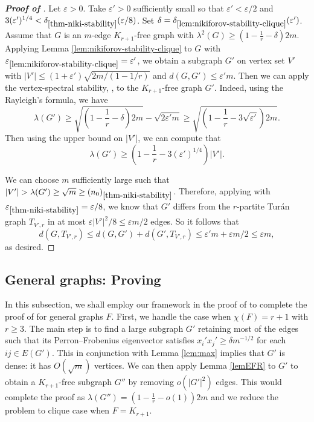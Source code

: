 \documentclass[11pt,a4paper]{article}
\theoremstyle{definition}
\theoremstyle{remark}
\begin{document}
\begin{proof}[{\bf Proof of }] 
Let $\varepsilon>0$. Take $\varepsilon'>0$ sufficiently small so that $\varepsilon'<\varepsilon/2$ and $3(\varepsilon')^{1/4}<\delta_{\ref{thm-niki-stability}}(\varepsilon/8)$. Set $\delta=\delta_{\ref{lem:nikiforov-stability-clique}}(\varepsilon')$. Assume that $G$ is an $m$-edge $K_{r+1}$-free graph with $\lambda^2 (G)\ge {(1- \frac{1}{r} - \delta)2m}$. 
Applying Lemma \ref{lem:nikiforov-stability-clique} to $G$ with $\varepsilon_{\ref{lem:nikiforov-stability-clique}}=\varepsilon'$, we obtain a subgraph $G'$ on vertex set $V'$ with $|V'|\le (1+\varepsilon')\sqrt{2m/(1-1/r)}$ and $d(G,G')\le \varepsilon' m$.
Then we can apply the vertex-spectral stability, , to the $K_{r+1}$-free graph $G'$. 
Indeed, using the Rayleigh's formula, we have 
\[ \lambda (G')\ge \sqrt{\left(1- \frac{1}{r} - \delta \right)2m} - \sqrt{2\varepsilon' m} 
\ge \sqrt{\left(1- \frac{1}{r} - 3\sqrt{\varepsilon'} \right)2m}. \]
Then using the upper bound on $|V'|$, we can compute that 
\[ \lambda (G') \ge \left( 1-\frac{1}{r} - 3(\varepsilon')^{1/4}\right) |V'|. \]

We can choose $m$ sufficiently large such that $|V'|> \lambda (G') \ge \sqrt{m} \ge (n_0)_{\ref{thm-niki-stability}}$. 
Therefore, applying  with $\varepsilon_{\ref{thm-niki-stability}}=\varepsilon/8$, 
we know that $G'$ differs from the $r$-partite Tur\'{a}n graph 
$T_{V',r}$ in at most 
$\varepsilon|V'|^2/8\le \varepsilon m/2$ edges. 
So it follows that 
$$d(G,T_{V',r}) \le d(G,G') + d(G',T_{V',r}) \le \varepsilon'm+\varepsilon m/2\le \varepsilon m,$$
as desired.
\end{proof}





\subsection{General graphs: Proving }\label{sec:F-general}
In this subsection, we shall employ our framework in the proof of  to complete the proof of  for general graphs $F$. 
First, we handle the case when $\chi (F)=r+1$ with $r \geq 3$. The main step is to find a large subgraph $G'$ retaining most of the edges such that its Perron--Frobenius eigenvector satisfies $x_i'x_j'\ge \delta m^{-1/2}$ for each $ij\in E(G')$. This in conjunction with Lemma \ref{lem:max} implies that $G'$ is dense: it has $O(\sqrt{m})$ vertices. We can then apply Lemma \ref{lemEFR} to $G'$ to obtain a $K_{r+1}$-free subgraph $G''$ by removing $o(|G'|^2)$ edges. This would complete the proof as $\lambda (G'')=(1-\frac{1}{r} -o(1))2m$ and we reduce the problem to clique case when $F = K_{r + 1}$.
\end{document}
